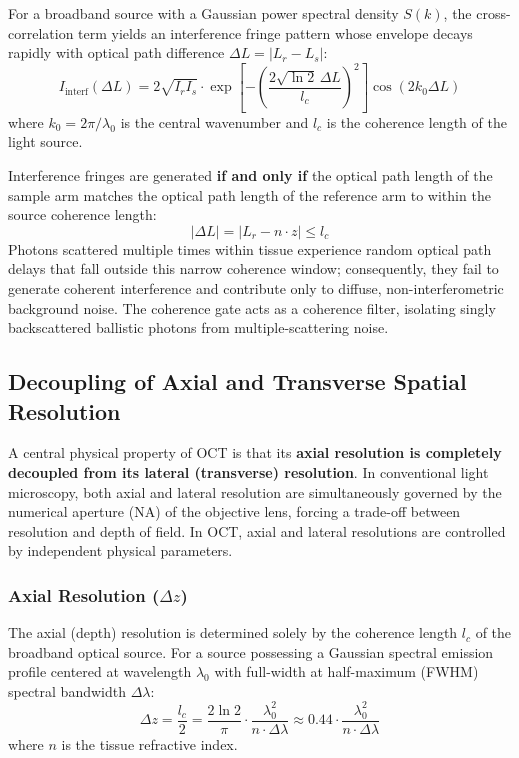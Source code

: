 \documentclass[11pt,a4paper]{article}
\begin{document}
For a broadband source with a Gaussian power spectral density $S(k)$, the cross-correlation term yields an interference fringe pattern whose envelope decays rapidly with optical path difference $\Delta L = |L_r - L_s|$:
\begin{equation}
    I_{\text{interf}}(\Delta L) = 2 \sqrt{I_r I_s} \cdot \exp \left[ - \left( \frac{2 \sqrt{\ln 2} \, \Delta L}{l_c} \right)^2 \right] \cos(2 k_0 \Delta L)
\end{equation}
where $k_0 = 2\pi / \lambda_0$ is the central wavenumber and $l_c$ is the coherence length of the light source.

\begin{opticalphysics}
Interference fringes are generated \textbf{if and only if} the optical path length of the sample arm matches the optical path length of the reference arm to within the source coherence length:
\begin{equation}
    |\Delta L| = |L_r - n \cdot z| \le l_c
\end{equation}
Photons scattered multiple times within tissue experience random optical path delays that fall outside this narrow coherence window; consequently, they fail to generate coherent interference and contribute only to diffuse, non-interferometric background noise. The coherence gate acts as a coherence filter, isolating singly backscattered ballistic photons from multiple-scattering noise.
\end{opticalphysics}

\subsection{Decoupling of Axial and Transverse Spatial Resolution}

A central physical property of OCT is that its \textbf{axial resolution is completely decoupled from its lateral (transverse) resolution}. In conventional light microscopy, both axial and lateral resolution are simultaneously governed by the numerical aperture ($\text{NA}$) of the objective lens, forcing a trade-off between resolution and depth of field. In OCT, axial and lateral resolutions are controlled by independent physical parameters.

\subsubsection{Axial Resolution ($\Delta z$)}
The axial (depth) resolution is determined solely by the coherence length $l_c$ of the broadband optical source. For a source possessing a Gaussian spectral emission profile centered at wavelength $\lambda_0$ with full-width at half-maximum (FWHM) spectral bandwidth $\Delta\lambda$:
\begin{equation}
    \Delta z = \frac{l_c}{2} = \frac{2 \ln 2}{\pi} \cdot \frac{\lambda_0^2}{n \cdot \Delta\lambda} \approx 0.44 \cdot \frac{\lambda_0^2}{n \cdot \Delta\lambda}
\end{equation}
where $n$ is the tissue refractive index. 
\end{document}

